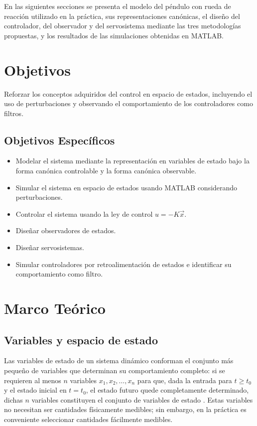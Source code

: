 \documentclass[conference]{IEEEtran}
\begin{document}
En las siguientes secciones se presenta el modelo del péndulo con rueda de reacción utilizado en la práctica, sus representaciones canónicas, el diseño del controlador, del observador y del servosistema mediante las tres metodologías propuestas, y los resultados de las simulaciones obtenidas en MATLAB.

\section{Objetivos}

Reforzar los conceptos adquiridos del control en espacio de estados, incluyendo el uso de perturbaciones y observando el comportamiento de los controladores como filtros.

\subsection*{Objetivos Específicos}
\begin{itemize}
    \item Modelar el sistema mediante la representación en variables de estado bajo la forma canónica controlable y la forma canónica observable.
    \item Simular el sistema en espacio de estados usando MATLAB considerando perturbaciones.
    \item Controlar el sistema usando la ley de control $u=-K\vec{x}$.
    \item Diseñar observadores de estados.
    \item Diseñar servosistemas.
    \item Simular controladores por retroalimentación de estados e identificar su comportamiento como filtro.
\end{itemize}

\section{Marco Teórico}

\subsection*{Variables y espacio de estado}
Las variables de estado de un sistema dinámico conforman el conjunto más pequeño de variables que determinan su comportamiento completo: si se requieren al menos $n$ variables $x_1,x_2,\dots,x_n$ para que, dada la entrada para $t\geq t_0$ y el estado inicial en $t=t_0$, el estado futuro quede completamente determinado, dichas $n$ variables constituyen el conjunto de variables de estado \cite{ogata_discreto}. Estas variables no necesitan ser cantidades físicamente medibles; sin embargo, en la práctica es conveniente seleccionar cantidades fácilmente medibles.
\end{document}
